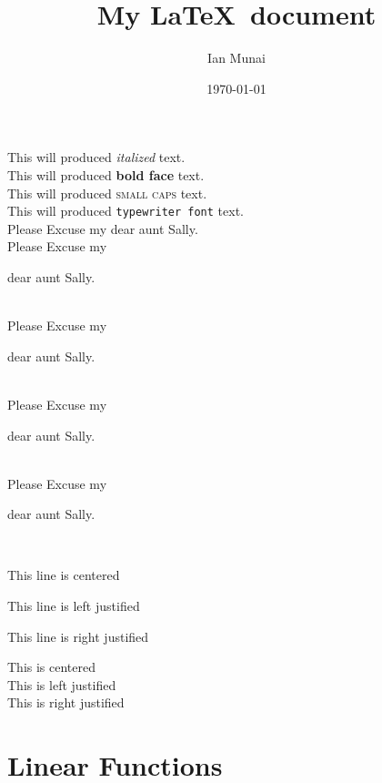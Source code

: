 \documentclass[11pt]{article}
\title{My \LaTeX\ document}
\author{Ian Munai}
\date{\today}
\begin{document}
\tableofcontents
\maketitle
This will produced \textit{italized} text.\\
This will produced \textbf{bold face} text.\\
This will produced \textsc{small caps} text.\\
This will produced \texttt{typewriter font} text.\\

\vspace{1cm}
Please Excuse my dear aunt Sally.\\
Please Excuse my \begin{large}
    dear aunt Sally.
\end{large}\\
Please Excuse my \begin{Large}
    dear aunt Sally.
\end{Large}\\
Please Excuse my \begin{huge}
    dear aunt Sally.
\end{huge}\\
Please Excuse my \begin{Huge}
    dear aunt Sally.
\end{Huge}\\

\vspace{1cm}
\begin{center}
    This line is centered
\end{center}
\begin{flushleft}
    This line is left justified
\end{flushleft}
\begin{flushright}
    This line is right justified
\end{flushright}


\Large
This is centered\\
This is left justified\\
This is right justified\\

\section{Linear Functions}
\end{document}
